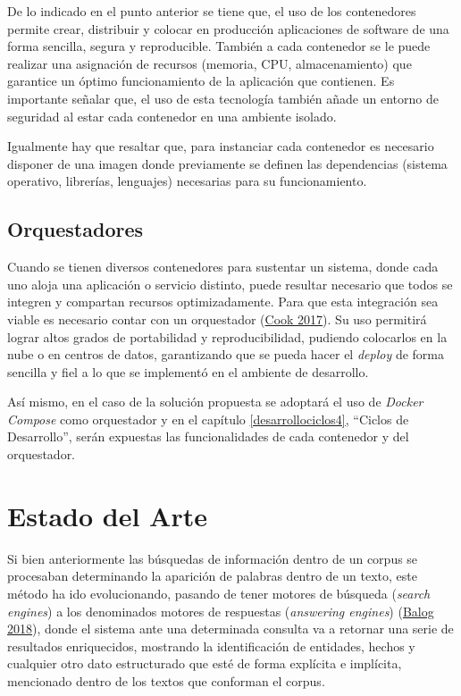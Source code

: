 \documentclass[
  12pt,
  openany]{book}
\begin{document}
De lo indicado en el punto anterior se tiene que, el uso de los contenedores permite crear, distribuir y colocar en producción aplicaciones de software de una forma sencilla, segura y reproducible. También a cada contenedor se le puede realizar una asignación de recursos (memoria, CPU, almacenamiento) que garantice un óptimo funcionamiento de la aplicación que contienen. Es importante señalar que, el uso de esta tecnología también añade un entorno de seguridad al estar cada contenedor en una ambiente isolado.

Igualmente hay que resaltar que, para instanciar cada contenedor es necesario disponer de una imagen donde previamente se definen las dependencias (sistema operativo, librerías, lenguajes) necesarias para su funcionamiento.

\hypertarget{orquestador}{%
\subsection{Orquestadores}\label{orquestador}}

Cuando se tienen diversos contenedores para sustentar un sistema, donde cada uno aloja una aplicación o servicio distinto, puede resultar necesario que todos se integren y compartan recursos optimizadamente. Para que esta integración sea viable es necesario contar con un orquestador (\protect\hyperlink{ref-cook2017}{Cook 2017}). Su uso permitirá lograr altos grados de portabilidad y reproducibilidad, pudiendo colocarlos en la nube o en centros de datos, garantizando que se pueda hacer el \emph{deploy} de forma sencilla y fiel a lo que se implementó en el ambiente de desarrollo.

Así mismo, en el caso de la solución propuesta se adoptará el uso de \emph{Docker Compose} como orquestador y en el capítulo \ref{desarrollociclos4}, ``Ciclos de Desarrollo'', serán expuestas las funcionalidades de cada contenedor y del orquestador.

\hypertarget{sota}{%
\section{Estado del Arte}\label{sota}}

Si bien anteriormente las búsquedas de información dentro de un corpus se procesaban determinando la aparición de palabras dentro de un texto, este método ha ido evolucionando, pasando de tener motores de búsqueda (\emph{search engines}) a los denominados motores de respuestas (\emph{answering engines}) (\protect\hyperlink{ref-balog2018}{Balog 2018}), donde el sistema ante una determinada consulta va a retornar una serie de resultados enriquecidos, mostrando la identificación de entidades, hechos y cualquier otro dato estructurado que esté de forma explícita e implícita, mencionado dentro de los textos que conforman el corpus.
\end{document}
